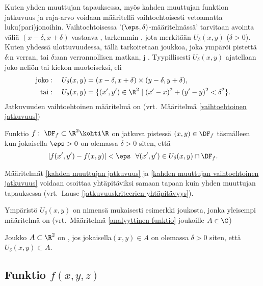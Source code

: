 Kuten yhden muuttujan tapauksessa, myös kahden muuttujan funktion jatkuvuus ja raja-arvo
voidaan määritellä vaihtoehtoisesti vetoamatta luku(pari)jonoi\-hin. Vaihtoehtoisessa
'$(\eps,\delta)$-määritelmässä' tarvitaan avointa väliä $(x-\delta,x+\delta)$ vastaava
%
, tarkemmin , jota merkitään
$U_\delta(x,y)$ ($\delta>0$). Kuten yhdessä ulottuvuudessa, tällä tarkoitetaan joukkoa, joka
ympäröi pistettä $\delta$:n verran, tai $\delta$:aan verrannollisen matkan, j
. Tyypillisesti $U_\delta(x,y)$ ajatellaan joko neliön tai kiekon muotoiseksi,
eli
\begin{align*}
\text{joko}&: \quad U_\delta(x,y)=(x-\delta,x+\delta)\times(y-\delta,y+\delta), \\
 \text{tai}&: \quad U_\delta(x,y)=\{(x',y')\in\R^2 \mid (x'-x)^2+(y'-y)^2<\delta^2\}.
\end{align*}
Jatkuvuuden vaihtoehtoinen määritelmä on (vrt.\ Määritelmä \ref{vaihtoehtoinen jatkuvuus})
\begin{Def} \label{kahden muuttujan vaihtoehtoinen jatkuvuus}
Funktio $f:\ \DF_f\subset\R^2\kohti\R$ on jatkuva pistessä $(x,y)\in\DF_f$ täsmälleen kun
jokaisella $\eps>0$ on olemassa $\delta>0$ siten, että
\[
|f(x',y')-f(x,y)| < \eps\ \ \forall (x',y') \in U_\delta(x,y)\cap\DF_f.
\]
\end{Def}
Määritelmät \ref{kahden muuttujan jatkuvuus} ja \ref{kahden muuttujan vaihtoehtoinen jatkuvuus}
voidaan osoittaa yhtäpitäviksi samaan tapaan kuin yhden muuttujan tapauksessa (vrt.\ Lause
\ref{jatkuvuuskriteerien yhtäpitävyys}).

Ympäristö $U_\delta(x,y)$ on nimensä mukaisesti esimerkki  joukosta, jonka
yleisempi määritelmä on (vrt.\ Määritelmä \ref{analyyttinen funktio} joukoille $A\in\C$)
\begin{Def} \label{avoin joukko}  
Joukko $A\subset\R^2$ on , jos jokaisella$(x,y) \in A$ on olemassa $\delta>0$ siten,
että $U_\delta(x,y) \subset A$.
\end{Def}
 
\subsection{Funktio $f(x,y,z)$}


